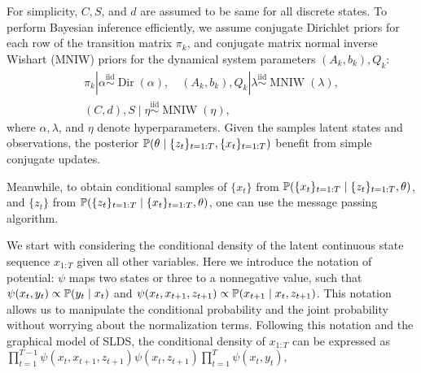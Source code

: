 For simplicity, $C, S$, and $d$ are assumed to be same for all discrete states. To perform Bayesian inference efficiently, we assume conjugate Dirichlet priors for each row of the transition matrix $\pi_{k}$, and conjugate matrix normal inverse Wishart (MNIW) priors for the dynamical system parameters $\left(A_{k}, b_{k}\right), Q_{k}$:
$$
\begin{gathered}
\pi_{k}\left|\alpha \stackrel{\mathrm{iid}}{\sim} \operatorname{Dir}(\alpha), \quad\left(A_{k}, b_{k}\right), Q_{k}\right| \lambda \stackrel{\mathrm{iid}}{\sim} \operatorname{MNIW}(\lambda), \\
\left(C, d\right), S \mid \eta \stackrel{\mathrm{iid}}{\sim} \operatorname{MNIW}(\eta),
\end{gathered}
$$
where $\alpha, \lambda$, and $\eta$ denote hyperparameters. 
Given the samples latent states and observations, the posterior $\mathbb{P}(\theta \mid \{z_t\}_{t=1:T}, \{x_{t}\}_{t=1:T})$ benefit from simple conjugate updates. 


Meanwhile, to obtain conditional samples of $\{x_t\}$ from $\mathbb{P}(\{x_{t}\}_{t=1:T} \mid \{z_t\}_{t=1:T}, \theta)$, and $\{z_t\}$ from $\mathbb{P}(\{z_{t}\}_{t=1:T} \mid \{x_t\}_{t=1:T}, \theta)$, one can use the message passing algorithm.

We start with considering the  conditional  density  of  the  latent continuous  state  sequence $x_{1:T}$ given  all  other  variables. Here we introduce the notation of potential: $\psi$ maps two states or three to a nonnegative value, such that $\psi(x_t,y_t)\propto \mathbb{P}(y_t \mid x_t)$ and $\psi(x_t,x_{t+1},z_{t+1})\propto \mathbb{P}(x_{t+1} \mid x_t,z_{t+1})$. This notation allows us to manipulate the conditional probability and the joint probability without worrying about the normalization terms. Following this notation and the graphical model of SLDS, the conditional density of $x_{1:T}$ can be expressed as $
\prod_{t=1}^{T-1} \psi\left(x_{t}, x_{t+1}, z_{t+1}\right) \psi\left(x_{t}, z_{t+1}\right) \prod_{t=1}^{T} \psi\left(x_{t}, y_{t}\right),
$

 
